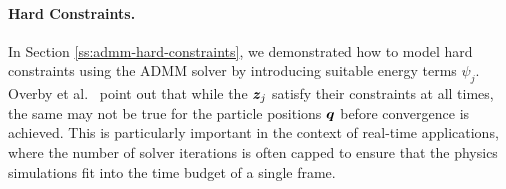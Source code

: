 \paragraph{Hard Constraints.}
In Section \ref{ss:admm-hard-constraints}, we demonstrated how to model hard constraints using the ADMM solver by introducing suitable energy terms $\psi_j$.
\noindent Overby et al.\ \cite{overby2017} point out that while the $\bm{z}_j$ satisfy their constraints at all times, the same may not be true for the particle 
positions $\bm{q}$ before convergence is achieved. This is particularly important in the context of real-time applications, where the number of solver iterations 
is often capped to ensure that the physics simulations fit into the time budget of a single frame.
